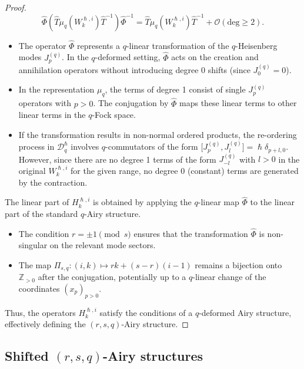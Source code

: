 \documentclass[reqno,11pt]{amsart}
\theoremstyle{plain}
\theoremstyle{definition}
\theoremstyle{remark}
\numberwithin{equation}{section}
\newcommand{\1}{\mathds{1}}
\newcommand{\2}{\frac{1}{2}}
\begin{document}
{\begin{proof}
{						\begin{equation}\label{eq:q_phi_approx}
							\hat{\Phi} \left( \hat{T} \mu_q(W^{\hslash,i}_k) \hat{T}^{-1} \right) \hat{\Phi}^{-1} = \hat{T} \mu_q(W^{\hslash,i}_k) \hat{T}^{-1} + \mathcal{O}(\text{deg} \geq 2).
						\end{equation}
						\begin{itemize}
							\item[(iii)] The operator $\hat{\Phi}$ represents a $q$-linear transformation of the $q$-Heisenberg modes $J^{(q)}_p$. In the $q$-deformed setting, $\hat{\Phi}$ acts on the creation and annihilation operators without introducing degree 0 shifts (since $J^{(q)}_0 = 0$).
							\item[(iv)] In the representation $\mu_q$, the terms of degree 1 consist of single $J^{(q)}_p$ operators with $p > 0$. The conjugation by $\hat{\Phi}$ maps these linear terms to other linear terms in the $q$-Fock space.
							\item[(v)] If the transformation results in non-normal ordered products, the re-ordering process in $\mathcal{D}_q^\hslash$ involves $q$-commutators of the form $\big[J^{(q)}_p, J^{(q)}_l\big] = \hslash \delta_{p+l,0}$. However, since there are no degree 1 terms of the form $J^{(q)}_{-l}$ with $l > 0$ in the original $W^{\hslash,i}_k$ for the given range, no degree 0 (constant) terms are generated by the contraction.
					\end{itemize}}                                  
					{The linear part of $H^{\hslash,i}_k$ is obtained by applying the $q$-linear map $\hat{\Phi}$ to the linear part of the standard $q$-Airy structure. 
						\begin{itemize}
							\item[(vi)] The condition $r = \pm 1 \pmod{s}$ ensures that the transformation $\hat{\Phi}$ is non-singular on the relevant mode sectors. 
							\item[(vii)] The map $\Pi_{s,q}: (i, k) \mapsto rk + (s-r)(i-1)$ remains a bijection onto $\mathbb{Z}_{>0}$ after the conjugation, potentially up to a $q$-linear change of the coordinates $(x_p)_{p>0}$.
						\end{itemize}
						Thus, the operators $H^{\hslash,i}_k$ satisfy the conditions of a $q$-deformed Airy structure, effectively defining the $(r,s,q)$-Airy structure.}
				\end{proof}
				\subsection{Shifted $(r,s,q)$-Airy structures}
				\label{s:shiftedrs}
				
}
\end{document}
